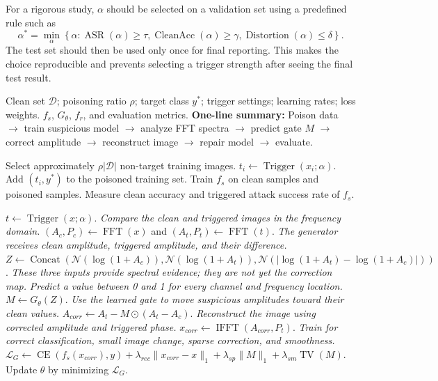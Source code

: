 \documentclass[11pt]{article}
\begin{document}
For a rigorous study, $\alpha$ should be selected on a validation set using a
predefined rule such as
\begin{equation}
    \alpha^*=\min_{\alpha}\left\{\alpha:\operatorname{ASR}(\alpha)\geq\tau,
    \operatorname{CleanAcc}(\alpha)\geq\gamma,
    \operatorname{Distortion}(\alpha)\leq\delta\right\}.
\end{equation}
The test set should then be used only once for final reporting. This makes the
choice reproducible and prevents selecting a trigger strength after seeing the
final test result.

\begin{algorithm}[t]
\caption{Selective spectral-correction defense}
\label{alg:selective-defense}
\begin{algorithmic}[1]
\Require Clean set $\mathcal{D}$; poisoning ratio $\rho$; target class $y^*$;
trigger settings; learning rates; loss weights.
\Ensure $f_s$, $G_\theta$, $f_r$, and evaluation metrics.
\Statex \textbf{One-line summary:} Poison data $\rightarrow$ train suspicious
model $\rightarrow$ analyze FFT spectra $\rightarrow$ predict gate $M$
$\rightarrow$ correct amplitude $\rightarrow$ reconstruct image
$\rightarrow$ repair model $\rightarrow$ evaluate.

\State Select approximately $\rho|\mathcal{D}|$ non-target training images.
    \State $t_i\gets\operatorname{Trigger}(x_i;\alpha)$.
    \State Add $(t_i,y^*)$ to the poisoned training set.
\EndFor
\State Train $f_s$ on clean samples and poisoned samples.
\State Measure clean accuracy and triggered attack success rate of $f_s$.

        \State $t\gets\operatorname{Trigger}(x;\alpha)$.
        \Statex \textit{Compare the clean and triggered images in the frequency domain.}
        \State $(A_c,P_c)\gets\operatorname{FFT}(x)$ and
        $(A_t,P_t)\gets\operatorname{FFT}(t)$.
        \Statex \textit{The generator receives clean amplitude, triggered amplitude, and their difference.}
        \State $Z\gets\operatorname{Concat}(\mathcal{N}(\log(1+A_c)),
        \mathcal{N}(\log(1+A_t)),
        \mathcal{N}(|\log(1+A_t)-\log(1+A_c)|))$.
        \Statex \textit{These three inputs provide spectral evidence; they are not yet the correction map.}
        \Statex \textit{Predict a value between 0 and 1 for every channel and frequency location.}
        \State $M\gets G_\theta(Z)$.
        \Statex \textit{Use the learned gate to move suspicious amplitudes toward their clean values.}
        \State $A_{corr}\gets A_t-M\odot(A_t-A_c)$.
        \Statex \textit{Reconstruct the image using corrected amplitude and triggered phase.}
        \State $x_{corr}\gets\operatorname{IFFT}(A_{corr},P_t)$.
        \Statex \textit{Train for correct classification, small image change, sparse correction, and smoothness.}
        \State $\mathcal{L}_G\gets\operatorname{CE}(f_s(x_{corr}),y)
        +\lambda_{rec}\|x_{corr}-x\|_1
        +\lambda_{sp}\|M\|_1+\lambda_{sm}\operatorname{TV}(M)$.
        \State Update $\theta$ by minimizing $\mathcal{L}_G$.
    \EndFor
\EndFor


\end{algorithmic}
\end{algorithm}
\end{document}
